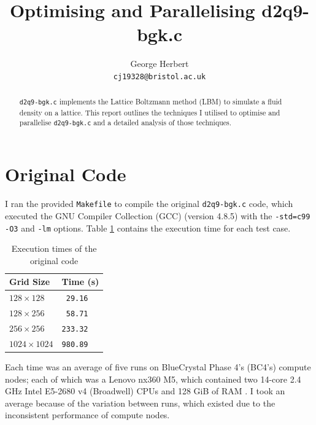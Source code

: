 \documentclass[twocolumn, a4paper]{article}
\author{
  George Herbert\\
  \texttt{cj19328@bristol.ac.uk}
}
\title{\vspace{-2em}Optimising and Parallelising d2q9-bgk.c}
\begin{document}
\maketitle

\begin{abstract}
    \texttt{d2q9-bgk.c} implements the Lattice Boltzmann method (LBM) to simulate a fluid density on a lattice.
    This report outlines the techniques I utilised to optimise and parallelise \texttt{d2q9-bgk.c} and a detailed analysis of those techniques.
\end{abstract}

\section{Original Code}

I ran the provided \texttt{Makefile} to compile the original \texttt{d2q9-bgk.c} code, which executed the GNU Compiler Collection (GCC) (version 4.8.5) with the \texttt{-std=c99} \texttt{-O3} and \texttt{-lm} options.
Table \ref{tab:original} contains the execution time for each test case.

\begin{table}[htbp]
    \begin{center}
    \caption{Execution times of the original code}\label{tab:original}
    \begin{tabular}[t]{l | l} 
        \hline\hline
        Grid Size&Time (s)\\
        \hline
        $128 \times 128$&\texttt{ 29.16}\\
        $128 \times 256$&\texttt{ 58.71}\\
        $256 \times 256$&\texttt{233.32}\\
        $1024 \times 1024$&\texttt{980.89}\\
        \hline
      \end{tabular}
    \end{center}
\end{table} 

Each time was an average of five runs on BlueCrystal Phase 4's (BC4's) compute nodes; each of which was a Lenovo nx360 M5, which contained two 14-core 2.4 GHz Intel E5-2680 v4 (Broadwell) CPUs and 128 GiB of RAM \cite{bcp4}.
I took an average because of the variation between runs, which existed due to the inconsistent performance of compute nodes.
\end{document}
